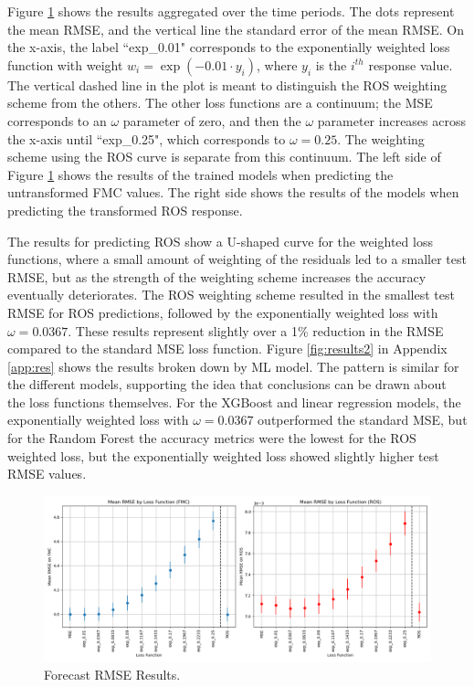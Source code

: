 \documentclass[11pt]{article}%
\begin{document}
Figure \ref{fig:results1} shows the results aggregated over the time periods. The dots represent the mean RMSE, and the vertical line the standard error of the mean RMSE. On the x-axis, the label ``exp\_0.01" corresponds to the exponentially weighted loss function with weight $w_i = \exp(-0.01\cdot y_i)$, where $y_i$ is the $i^{th}$ response value. The vertical dashed line in the plot is meant to distinguish the ROS weighting scheme from the others. The other loss functions are a continuum; the MSE corresponds to an $\omega$ parameter of zero, and then the $\omega$ parameter increases across the x-axis until ``exp\_0.25", which corresponds to $\omega=0.25$. The weighting scheme using the ROS curve is separate from this continuum. The left side of Figure \ref{fig:results1} shows the results of the trained models when predicting the untransformed FMC values. The right side shows the results of the models when predicting the transformed ROS response.

The results for predicting ROS show a U-shaped curve for the weighted loss functions, where a small amount of weighting of the residuals led to a smaller test RMSE, but as the strength of the weighting scheme increases the accuracy eventually deteriorates. The ROS weighting scheme resulted in the smallest test RMSE for ROS predictions, followed by the exponentially weighted loss with $\omega = 0.0367$. These results represent slightly over a 1\% reduction in the RMSE compared to the standard MSE loss function. Figure \ref{fig:results2} in Appendix \ref{app:res} shows the results broken down by ML model. The pattern is similar for the different models, supporting the idea that conclusions can be drawn about the loss functions themselves. For the XGBoost and linear regression models, the exponentially weighted loss with $\omega = 0.0367$ outperformed the standard MSE, but for the Random Forest the accuracy metrics were the lowest for the ROS weighted loss, but the exponentially weighted loss showed slightly higher test RMSE values. 

\begin{figure}[ht]
    \centering
    \includegraphics[width=1\textwidth]{images/results1.png}
    \caption{Forecast RMSE Results.}
    \label{fig:results1}
\end{figure}
\end{document}
